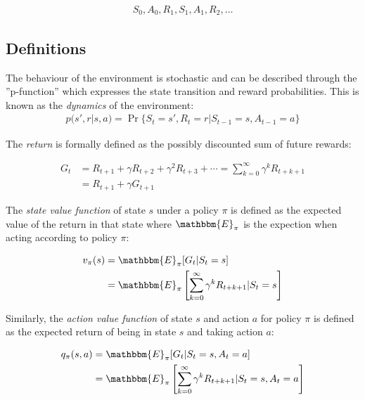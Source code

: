 \begin{align*}S_0, A_0, R_1, S_1, A_1, R_2, \ldots
\end{align*}

\subsection{Definitions}

The behaviour of the environment is stochastic and can be described through the ''p-function'' which expresses the state transition and reward probabilities. This is known as the \emph{dynamics} of the environment: 
\begin{align}p(s', r | s, a) = \operatorname{Pr}\{S_t = s', R_t =r | S_{t-1} = s, A_{t-1} = a \} \label{eq:dynamics}
\end{align}

The \emph{return} is formally defined as the possibly discounted sum of future rewards:

\begin{align}
G_t &= R_{t+1} + \gamma R_{t+2} + \gamma^2 R_{t+3} + \cdots = \sum_{k=0}^{\infty} \gamma^k R_{t+k+1} \nonumber \\
    &= R_{t+1} + \gamma G_{t+1} \label{eq:return}
\end{align}

The \emph{state value function} of state $s$ under a policy $\pi$ is defined as the expected value of the return in that state where $\mathbbm{E}_{\pi}$ is the expection when acting according to policy $\pi$:

\begin{align}
v_\pi(s) &= \mathbbm{E}_\pi [ G_t | S_t = s]  \label{eq:statevalue1} \\
&= \mathbbm{E}_\pi \left[ \sum_{k=0}^\infty \gamma^k R_{t + k + 1} | S_t = s \right] \nonumber
\end{align}

Similarly, the \emph{action value function} of state $s$ and action $a$ for policy $\pi$ is defined as the expected return of being in state $s$ and taking action $a$:

\begin{align}
q_\pi(s, a) &= \mathbbm{E}_\pi [ G_t | S_t = s, A_t = a] \label{eq:actionvalue} \\
&= \mathbbm{E}_\pi \left[ \sum_{k=0}^\infty \gamma^k R_{t + k + 1} | S_t = s, A_t = a \right] \nonumber
\end{align}

